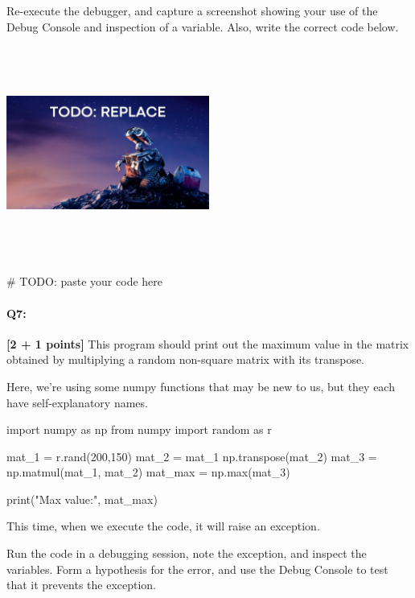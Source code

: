 \documentclass[11pt]{article}
\begin{document}

Re-execute the debugger, and capture a screenshot showing your use of the Debug Console and inspection of a variable. Also, write the correct code below.

\begin{tcolorbox}[colback=white!5!white,colframe=green!75!black,height=8cm,height fill]
    \includegraphics[width=0.5\textwidth,height=7cm,keepaspectratio]{images/TODO wall-e.jpg}
    
    \begin{python}
    # TODO: paste your code here
    \end{python}
\end{tcolorbox}



\pagebreak
\paragraph{Q7:} \textbf{[2 + 1 points]} This program should print out the maximum value in the matrix obtained by multiplying a random non-square matrix with its transpose.

Here, we're using some numpy functions that may be new to us, but they each have self-explanatory names.

\begin{python}
import numpy as np
from numpy import random as r

mat_1 = r.rand(200,150)
mat_2 = mat_1
np.transpose(mat_2)
mat_3 = np.matmul(mat_1, mat_2)
mat_max = np.max(mat_3)

print("Max value:", mat_max)
\end{python}

This time, when we execute the code, it will raise an exception.

\begin{tcolorbox}[colback=orange!5!white,colframe=orange!75!black]
Run the code in a debugging session, note the exception, and inspect the variables. Form a hypothesis for the error, and use the Debug Console to test that it prevents the exception. 
\end{tcolorbox}
\end{document}
